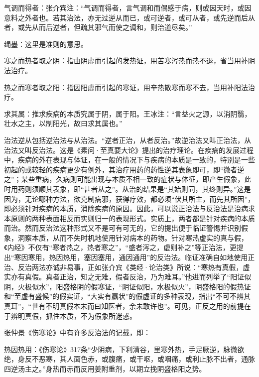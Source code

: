 \documentclass[draft,12pt]{ctexbook}
\begin{document}
\begin{jiaozhu}
  \item 气调而得者：张介宾注：“气调而得者，言气调和而偶感于病，则或因天时，或因意料之外者也。若其治法，亦无过逆从而已，或可逆者，或可从者，或先逆而后从者，或先从而后逆者，但疏其邪气而使之调和，则治道尽矣。”
  \item 绳墨：这里是准则的意思。
  \item 寒之而热者取之阴：指由阴虚而引起的发热证，用苦寒泻热而热不退，省当用补阴法治疗。
  \item 热之而寒者取之阳：指因阳虚而引起的寒证，用辛热散寒而寒不去，当用补阳法治疗。
  \item 求其属：推求疾病的本质究属于阴，属于阳。王冰注：“言益火之源，以消阴翳，壮水之主，以制阳光，故曰求其属也。”
\end{jiaozhu}



治法逆从包括逆治法与从治法。“逆者正治，从者反治。”故逆治法又叫正治法，从治法又叫反治法。这是《素问·至真要大论》提出的治疗理论。在疾病的发展过程中，疾病的外在表现与体证，在一般的情况下与疾病的本质是一致的，特别是一些初起的或较轻的疾病更少有例外，其治疗用药的药性逆其表象即可，即“微者逆之”；某些重病，久病则可能出现与本质不相一致的症状与体征，即产生假象，此时用药则须顺其表象，即“甚者从之”。从治的结果是“其始则同，其终则异。”这是因为，无论哪种方法，欲克制病邪，获得疗效，都必须“伏其所主，而先其所因”，即必须针对疾病的本质，消除疾病的原因。因此，可以说正治法与反治法是治病求本原则的两种表面相反而实则归一的表现形式。实质上，两者都是针对疾病的本质而治。然而反治法这种形式又不是可有可无的，它的提出便于临证警惕并识别假象，洞察本质，从而不失时机地使用针对病本的药物。针对寒热虚实的真与假，《内经》不仅有“寒者热之，热者寒之”，“盛者泻之，虚则补之”等正治法，更提出“寒因寒用，热因热用，塞因塞用，通因通用”的反治法。临证准确自如地使用正治、反治两法亦诚非易事，正如张介宾《类经·论治类》所说：“寒热有真假，虚实亦有真假。真者正治，知之无难，假者反治，乃为难耳。”他进而列举了“阳证似阴，火极似水”，阳盛格阴的假寒证，“阴证似阳，水极似火”，阴盛格阳的假热证和“至虚有盛候”的假实证，“大实有羸状”的假虚证的多种表现，指出“不可不辨其真耳”，“世有不明真假本末而曰知医者，余未敢许也”。可见，正反之用的前提在于辨明真假，抓住本质，不为假象所迷惑。



张仲景《伤寒论》中有许多反治法的记载，即：

热因热用：《伤寒论》317条“少阴病，下利清谷，里寒外热，手足厥逆，脉微欲绝，身反不恶寒，其人面色赤，或腹痛，或干呕，或咽痛，或利止脉不出者，通脉四逆汤主之。”身热而赤而反用姜附重剂，以期立挽阴盛格阳之势。
\end{document}
